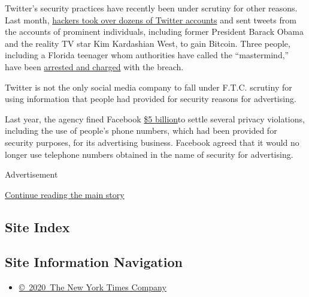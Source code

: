 Twitter's security practices have recently been under scrutiny for other
reasons. Last month,
\href{https://www.nytimes.com/2020/07/15/technology/twitter-hack-bill-gates-elon-musk.html}{hackers
took over dozens of Twitter accounts} and sent tweets from the accounts
of prominent individuals, including former President Barack Obama and
the reality TV star Kim Kardashian West, to gain Bitcoin. Three people,
including a Florida teenager whom authorities have called the
``mastermind,'' have been
\href{https://www.nytimes.com/2020/07/31/technology/twitter-hack-arrest.html}{arrested
and charged} with the breach.

Twitter is not the only social media company to fall under F.T.C.
scrutiny for using information that people had provided for security
reasons for advertising.

Last year, the agency fined Facebook
\href{https://www.ftc.gov/news-events/press-releases/2019/07/ftc-imposes-5-billion-penalty-sweeping-new-privacy-restrictions}{\$5
billion}to settle several privacy violations, including the use of
people's phone numbers, which had been provided for security purposes,
for its advertising business. Facebook agreed that it would no longer
use telephone numbers obtained in the name of security for advertising.

Advertisement

\protect\hyperlink{after-bottom}{Continue reading the main story}

\hypertarget{site-index}{%
\subsection{Site Index}\label{site-index}}

\hypertarget{site-information-navigation}{%
\subsection{Site Information
Navigation}\label{site-information-navigation}}

\begin{itemize}
\tightlist
\item
  \href{https://help.nytimes.com/hc/en-us/articles/115014792127-Copyright-notice}{©~2020~The
  New York Times Company}
\end{itemize}

